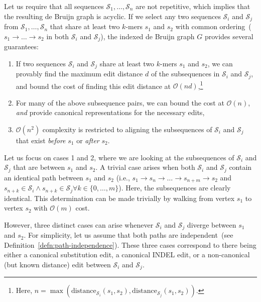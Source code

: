 \documentclass{bioinfo}
\begin{document}
\begin{methods}
Let us require that all sequences $\mathcal{S}_1, \dots, \mathcal{S}_n$ are not repetitive, which implies
that the resulting de Bruijn graph is acyclic. If we select any two sequences $\mathcal{S}_i$ and
$\mathcal{S}_j$ from $\mathcal{S}_1, \dots, \mathcal{S}_n$ that share at least two $k$-mers $s_1$ and
$s_2$ with common ordering~($s_1 \rightarrow \dots \rightarrow s_2$ in both $\mathcal{S}_i$ and
$\mathcal{S}_j$), the indexed de Bruijn graph $G$ provides several guarantees:

\begin{enumerate}
\item If two sequences $\mathcal{S}_i$ and $\mathcal{S}_j$ share at least two $k$-mers $s_1$ and
$s_2$, we can provably find the maximum edit distance $d$ of the subsequences in $\mathcal{S}_i$ and
$\mathcal{S}_j$, and bound the cost of finding this edit distance at $\mathcal{O}(nd)$,\footnote{Here,
$n = \max(\text{distance}_{\mathcal{S}_i}(s_1, s_2), \text{distance}_{\mathcal{S}_j}(s_1, s_2))$.}
\item For many of the above subsequence pairs, we can bound the cost at $\mathcal{O}(n)$, \emph{and}
provide canonical representations for the necessary edits,
\item $\mathcal{O}(n^2)$ complexity is restricted to aligning the subsequences of $\mathcal{S}_i$ and
$\mathcal{S}_j$ that exist \emph{before} $s_1$ or \emph{after} $s_2$.
\end{enumerate}

Let us focus on cases 1 and 2, where we are looking at the subsequences of $\mathcal{S}_i$ and
$\mathcal{S}_j$ that are between $s_1$ and $s_2$. A trivial case arises when both $\mathcal{S}_i$ and
$\mathcal{S}_j$ contain an identical path between $s_1$ and $s_2$ (i.e.,
$s_1 \rightarrow s_n \rightarrow \dots \rightarrow s_{n + m} \rightarrow s_2$ and
$s_{n + k} \in \mathcal{S}_i \wedge s_{n + k} \in \mathcal{S}_j \forall k \in \{0, \dots , m\}$). Here, the
subsequences are clearly identical. This determination can be made trivially by walking from vertex $s_1$
to vertex $s_2$ with $\mathcal{O}(m)$ cost.

However, three distinct cases can arise whenever $\mathcal{S}_i$ and $\mathcal{S}_j$ diverge between
$s_1$ and $s_2$. For simplicity, let us assume that both paths are independent~(see
Definition~\ref{defn:path-independence}). These three cases correspond to there being either a canonical
substitution edit, a canonical INDEL edit, or a non-canonical (but known distance) edit between
$\mathcal{S}_i$ and $\mathcal{S}_j$.


\end{methods}
\end{document}

